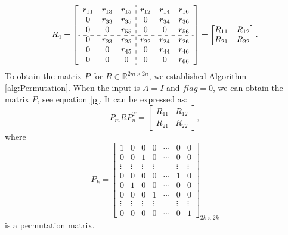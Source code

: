 \documentclass[12pt]{article}
\numberwithin{equation}{section} %
\begin{document}
\[R_4 = \begin{bmatrix}
\begin{array}{ccc:ccc}
 r_{11} & r_{13} & r_{15} & r_{12} & r_{14} & r_{16}\\
 0      & r_{33} & r_{35} & 0      & r_{34} & r_{36}\\
 0      & 0      & r_{55} & 0      & 0      & r_{56}\\
 \cdashline{1-6}
0 & r_{23} & r_{25} & r_{22} & r_{24} & r_{26}\\
 0      & 0 & r_{45} & 0      & r_{44} & r_{46}\\
 0      & 0      & 0 & 0      & 0      & r_{66}\\
\end{array}
\end{bmatrix}=\begin{bmatrix}
    R_{11} & R_{12}\\R_{21} & R_{22}
\end{bmatrix}.
\]
To obtain the matrix $P$ for $R \in \mathbb{R}^{2m \times 2n}$, we established Algorithm \eqref{alg:Permutation}. When the input is $A=I$ and $flag=0$, we can obtain the matrix $P$, see equation  \ref{p}. It can be expressed as:
\begin{equation}
    P_{m} R P_{n}^T = \begin{bmatrix} R_{11} & R_{12}\\R_{21}& R_{22}\end{bmatrix},\label{eq:Rn}
\end{equation}
where
\begin{equation}\label{p}
    P_k = \begin{bmatrix} 
            1 & 0 & 0 & 0 & \cdots & 0 & 0\\ 
            0 & 0 & 1 & 0 & \cdots & 0 & 0\\ 
            \vdots & \vdots & \vdots & \vdots &  & \vdots & \vdots\\ 
            0 & 0 & 0 & 0 & \cdots & 1 & 0 \\
            0 & 1 & 0 & 0 & \cdots & 0 & 0\\ 
            0 & 0 & 0 & 1 & \cdots & 0 & 0\\ 
            \vdots & \vdots & \vdots & \vdots &  & \vdots & \vdots\\ 
            0 & 0 & 0 & 0 &\cdots & 0 & 1 
        \end{bmatrix}_{2k \times 2k}
\end{equation}
is a permutation matrix.
\end{document}
